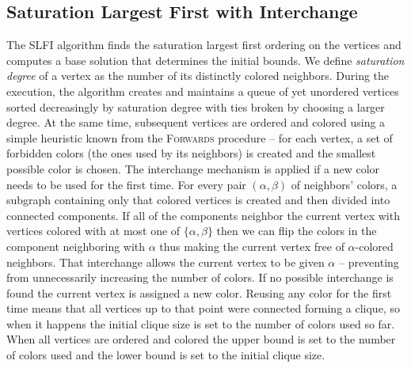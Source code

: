 \subsection{Saturation Largest First with Interchange}
The SLFI algorithm finds the saturation largest first ordering on the vertices and computes a base solution that determines the initial bounds. We define \textit{saturation degree} of a vertex as the number of its distinctly colored neighbors. During the execution, the algorithm creates and maintains a queue of yet unordered vertices sorted decreasingly by saturation degree with ties broken by choosing a larger degree. At the same time, subsequent vertices are ordered and colored using a simple heuristic known from the \textsc{Forwards} procedure -- for each vertex, a set of forbidden colors (the ones used by its neighbors) is created and the smallest possible color is chosen. The interchange mechanism is applied if a new color needs to be used for the first time. For every pair $(\alpha, \beta)$ of neighbors' colors, a subgraph containing only that colored vertices is created and then divided into connected components. If all of the components neighbor the current vertex with vertices colored with at most one of $\{\alpha, \beta\}$ then we can flip the colors in the component neighboring with $\alpha$ thus making the current vertex free of $\alpha$-colored neighbors. That interchange allows the current vertex to be given $\alpha$ -- preventing from unnecessarily increasing the number of colors. If no possible interchange is found the current vertex is assigned a new color. Reusing any color for the first time means that all vertices up to that point were connected forming a clique, so when it happens the initial clique size is set to the number of colors used so far. When all vertices are ordered and colored the upper bound is set to the number of colors used and the lower bound is set to the initial clique size.

